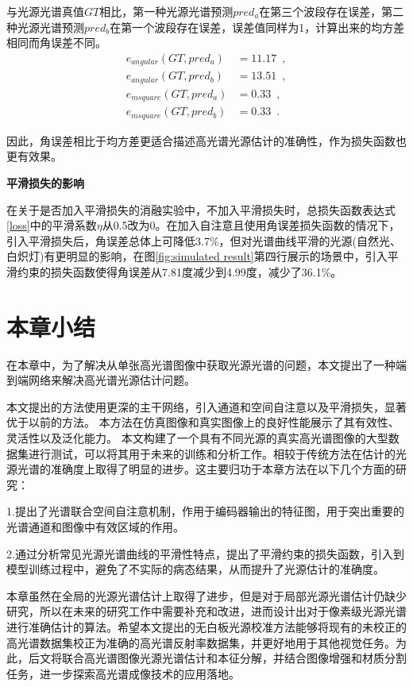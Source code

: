 \documentclass[
    type = master, %
    degree = academic,        %
    decl-page,  %
  ]{njuthesis}
\begin{document}
与光源光谱真值$GT$相比，第一种光源光谱预测$pred_{a}$在第三个波段存在误差，第二种光源光谱预测$pred_{b}$在第一个波段存在误差，误差值同样为1，计算出来的均方差相同而角误差不同。
\begin{align*}
e_{angular}(GT,pred_{a}) &= 11.17\enspace, \\
e_{angular}(GT,pred_{b}) &= 13.51\enspace, \\
e_{msquare}(GT,pred_{a}) &= 0.33\enspace, \\
e_{msquare}(GT,pred_{b}) &= 0.33\enspace.
\end{align*}

因此，角误差相比于均方差更适合描述高光谱光源估计的准确性，作为损失函数也更有效果。

\textbf{平滑损失的影响}

在关于是否加入平滑损失的消融实验中，不加入平滑损失时，总损失函数表达式\ref{loss}中的平滑系数$\eta$从0.5改为0。在加入自注意且使用角误差损失函数的情况下，引入平滑损失后，角误差总体上可降低3.7\%，但对光谱曲线平滑的光源(自然光、白炽灯)有更明显的影响，在图\ref{fig:simulated result}第四行展示的场景中，引入平滑约束的损失函数使得角误差从7.81度减少到4.99度，减少了36.1\%。



\section{本章小结}
在本章中，为了解决从单张高光谱图像中获取光源光谱的问题，本文提出了一种端到端网络来解决高光谱光源估计问题。 

本文提出的方法使用更深的主干网络，引入通道和空间自注意以及平滑损失，显著优于以前的方法。 本方法在仿真图像和真实图像上的良好性能展示了其有效性、灵活性以及泛化能力。 本文构建了一个具有不同光源的真实高光谱图像的大型数据集进行测试，可以将其用于未来的训练和分析工作。相较于传统方法在估计的光源光谱的准确度上取得了明显的进步。这主要归功于本章方法在以下几个方面的研究：

1.提出了光谱联合空间自注意机制，作用于编码器输出的特征图，用于突出重要的光谱通道和图像中有效区域的作用。

2.通过分析常见光源光谱曲线的平滑性特点，提出了平滑约束的损失函数，引入到模型训练过程中，避免了不实际的病态结果，从而提升了光源估计的准确度。

本章虽然在全局的光源光谱估计上取得了进步，但是对于局部光源光谱估计仍缺少研究，所以在未来的研究工作中需要补充和改进，进而设计出对于像素级光源光谱进行准确估计的算法。希望本文提出的无白板光源校准方法能够将现有的未校正的高光谱数据集校正为准确的高光谱反射率数据集，并更好地用于其他视觉任务。为此，后文将联合高光谱图像光源光谱估计和本征分解，并结合图像增强和材质分割任务，进一步探索高光谱成像技术的应用落地。 
\end{document}
